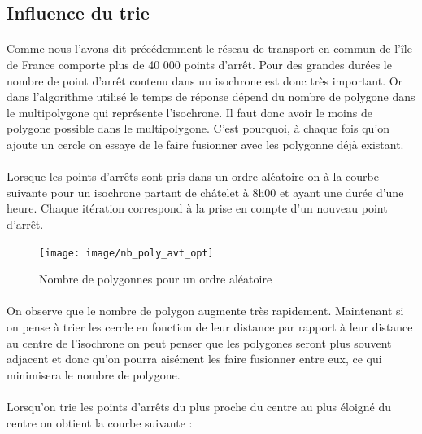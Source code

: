 \documentclass[a4paper]{report}
\begin{document}
\subsection{Influence du trie}

\paragraph{}Comme nous l'avons dit précédemment le réseau de transport en commun de l'île de France comporte plus de 40 000 points d'arrêt. Pour des grandes durées le nombre de point d'arrêt contenu dans un isochrone est donc très important. Or dans l'algorithme utilisé le temps de réponse dépend du nombre de polygone dans le multipolygone qui représente l'isochrone. Il faut donc avoir le moins de polygone possible dans le multipolygone. C'est pourquoi, à chaque fois qu'on ajoute un cercle on essaye de le faire fusionner avec les polygonne déjà existant. 

\paragraph{} Lorsque les points d'arrêts sont pris dans un ordre aléatoire on à la courbe suivante pour un isochrone partant de châtelet à 8h00 et ayant une durée d'une heure. Chaque itération correspond à la prise en compte d'un nouveau point d'arrêt.

\begin{figure}[H]
	\begin{center}
		\texttt{[image: image/nb\_poly\_avt\_opt]}
		\caption{Nombre de polygonnes pour un ordre aléatoire}
		\label{Nombre de polygonnes pour un ordre aléatoire}
	\end{center}
\end{figure}

\paragraph{} On observe que le nombre de polygon augmente très rapidement. Maintenant si on pense à trier les cercle en fonction de leur distance par rapport à leur distance au centre de l'isochrone on peut penser que les polygones seront plus souvent adjacent et donc qu'on pourra aisément les faire fusionner entre eux, ce qui minimisera le nombre de polygone. 

\paragraph{} Lorsqu'on trie les points d'arrêts du plus proche du centre au plus éloigné du centre on obtient la courbe suivante :
\end{document}
